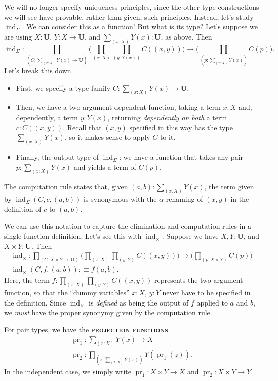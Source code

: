 \documentclass{article}
\newcommand{\defn}[1]{{\scshape\bfseries\color{MPBemph}#1}}
\newcommand{\eql}{\mathbin{:\equiv}}
\newcommand{\U}{\mathbf{U}}
\newcommand{\tpi}[1]{\prod_{(#1)}}
\newcommand{\tsigma}[1]{\sum_{(#1)}}
\DeclareMathOperator{\ind}{ind}
\DeclareMathOperator{\pr}{pr}
\newcommand{\1}{\textbf{1}}
\newcommand{\0}{\mathbf{0}}
\newcommand{\2}{\textbf{2}}
\begin{document}
We will no longer specify uniqueness principles, since the other type constructions we will see have provable, rather than given, such principles. Instead, let's study \( \ind_{\Sigma} \). We can consider this as a function! But what is its type? Let's suppose we are using \( X : \U \), \( Y : X \to \U \), and \( \tsigma{x : X} Y(x) : \U \), as above. Then
\[ \ind_{\Sigma} : \tpi{C : \tsigma{x : X} Y(x) \to \U} \big( \tpi{x : X} \tpi{y : Y(x)} C((x, y)) \big) \to \big( \tpi{p : \tsigma{x : X} Y(x)} C(p) \big). \]
Let's break this down. \begin{itemize}
	\item First, we specify a type family \( C : \tsigma{x : X} Y(x) \to \U \).
	\item Then, we have a two-argument dependent function, taking a term \( x : X \) and, dependently, a term \( y : Y(x) \), returning \emph{dependently on both} a term \( c : C((x, y)) \). Recall that \( (x, y) \) specified in this way has the type \( \tsigma{x : X} Y(x) \), so it makes sense to apply \( C \) to it.
	\item Finally, the output type of \( \ind_{\Sigma} \): we have a function that takes any pair \( p : \tsigma{x : X} Y(x) \) and yields a term of \( C(p) \).
\end{itemize}
The computation rule states that, given \( (a, b) : \tsigma{x : X} Y(x) \), the term given by \( \ind_{\Sigma}(C, c, (a, b)) \) is synonymous with the \( \alpha \)-renaming of \( (x, y) \) in the definition of \( c \) to \( (a, b) \).

We can use this notation to capture the elimination and computation rules in a single function definition. Let's see this with \( \ind_{\times} \). Suppose we have \( X, Y : \U \), and \( X \times Y : \U \). Then
\[ \begin{array}{c}
	\ind_{\times} : \tpi{C : X \times Y \to \U} \big( \tpi{x : X} \tpi{y : Y} C((x, y)) \big) \to \big( \tpi{p : X \times Y} C(p) \big) \\[3pt]
	\ind_{\times}(C, f, (a, b)) \eql f(a, b).
\end{array} \]
Here, the term \( f : \tpi{x : X} \tpi{y : Y} C((x, y)) \) represents the two-argument function, so that the ``dummy variables'' \( x : X \), \( y : Y \) never have to be specified in the definition. Since \( \ind_{\times} \) is \emph{defined} as being the output of \( f \) applied to \( a \) and \( b \), we \emph{must} have the proper synonymy given by the computation rule.

For pair types, we have the \defn{projection functions}
\[ \begin{array}{c}
	\pr_{1} : \tsigma{x : X} Y(x) \to X \\
	\pr_{2} : \tpi{z : \tsigma{x : X} Y(x)} Y(\pr_{1}(z)).
\end{array} \]
In the independent case, we simply write \( \pr_{1} : X \times Y \to X \) and \( \pr_{2} : X \times Y \to Y \).
\end{document}

